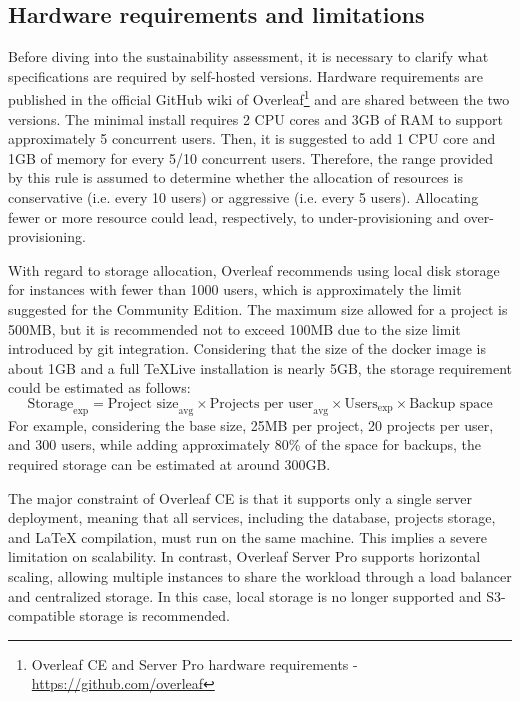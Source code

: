 \subsection{Hardware requirements and limitations}
Before diving into the sustainability assessment, it is necessary to clarify what specifications are required by self-hosted versions. Hardware requirements are published in the official GitHub wiki of Overleaf\footnote{Overleaf CE and Server Pro hardware requirements - \href{https://github.com/overleaf/overleaf/wiki/Hardware-Requirements}{https://github.com/overleaf}} and are shared between the two versions.
The minimal install requires 2 CPU cores and 3GB of RAM to support approximately 5 concurrent users. Then, it is suggested to add 1 CPU core and 1GB of memory for every 5/10 concurrent users. Therefore, the range provided by this rule is assumed to determine whether the allocation of resources is conservative (i.e. every 10 users) or aggressive (i.e. every 5 users). Allocating fewer or more resource could lead, respectively, to under-provisioning and over-provisioning.

With regard to storage allocation, Overleaf recommends using local disk storage for instances with fewer than 1000 users, which is approximately the limit suggested for the Community Edition. The maximum size allowed for a project is 500MB, but it is recommended not to exceed 100MB due to the size limit introduced by git integration. Considering that the size of the docker image is about 1GB and a full TeXLive installation is nearly 5GB, the storage requirement could be estimated as follows:
\[
\text{Storage}_{\text{exp}} = \text{Project size}_{\text{avg}} \times \text{Projects per user}_{\text{avg}} \times \text{Users}_{\text{exp}} \times \text{Backup space}
\]
For example, considering the base size, 25MB per project, 20 projects per user, and 300 users, while adding approximately 80\% of the space for backups, the required storage can be estimated at around 300GB.

The major constraint of Overleaf CE is that it supports only a single server deployment, meaning that all services, including the database, projects storage, and LaTeX compilation, must run on the same machine. This implies a severe limitation on scalability. In contrast, Overleaf Server Pro supports horizontal scaling, allowing multiple instances to share the workload through a load balancer and centralized storage. In this case, local storage is no longer supported and S3-compatible storage is recommended.

